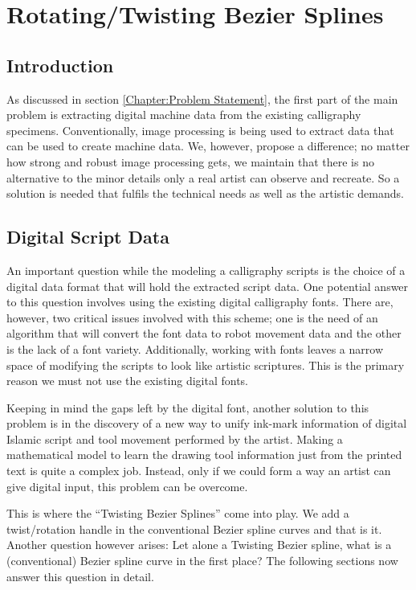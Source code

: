 \section{Rotating/Twisting Bezier Splines}
\label{Chapter:Twisting Splines}

    \subsection{Introduction}
    As discussed in section \ref{Chapter:Problem Statement}, the first part of the main problem is extracting digital machine data from the existing calligraphy specimens.  Conventionally, image processing is being used to extract data that can be used to create machine data. We, however, propose a difference; no matter how strong and robust image processing gets, we maintain that there is no alternative to the minor details only a real artist can observe and recreate. So a solution is needed that fulfils the technical needs as well as the artistic demands.


    \subsection{Digital Script Data}

    An important question while the modeling a calligraphy scripts is the choice of a digital data format that will hold the extracted script data. One potential answer to this question involves using the existing digital calligraphy fonts. There are, however, two critical issues involved with this scheme; one is the need of an algorithm that will convert the font data to robot movement data and the other is the lack of a font variety. Additionally, working with fonts leaves a narrow space of modifying the scripts to look like artistic scriptures. This is the primary reason we must not use the existing digital fonts.

    Keeping in mind the gaps left by the digital font, another solution to this problem is in the discovery of a new way to unify ink-mark information of digital Islamic script and tool movement performed by the artist. Making a mathematical model to learn the drawing tool information just from the printed text is quite a complex job. Instead, only if we could form a way an artist can give digital input, this problem can be overcome.

    This is where the ``Twisting Bezier Splines'' come into play. We add a twist/rotation handle in the conventional Bezier spline curves and that is it. Another question however arises: Let alone a Twisting Bezier spline, what is a (conventional) Bezier spline curve in the first place? The following sections now answer this question in detail.

